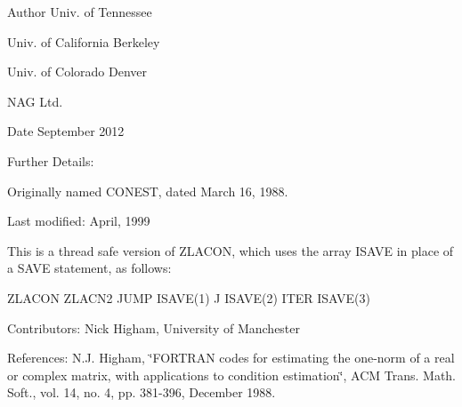 \begin{DoxyAuthor}{Author}
Univ. of Tennessee 

Univ. of California Berkeley 

Univ. of Colorado Denver 

N\+A\+G Ltd. 
\end{DoxyAuthor}
\begin{DoxyDate}{Date}
September 2012 
\end{DoxyDate}
\begin{DoxyParagraph}{Further Details\+: }
\begin{DoxyVerb}  Originally named CONEST, dated March 16, 1988.

  Last modified:  April, 1999

  This is a thread safe version of ZLACON, which uses the array ISAVE
  in place of a SAVE statement, as follows:

     ZLACON     ZLACN2
      JUMP     ISAVE(1)
      J        ISAVE(2)
      ITER     ISAVE(3)\end{DoxyVerb}
 
\end{DoxyParagraph}
\begin{DoxyParagraph}{Contributors\+: }
Nick Higham, University of Manchester 
\end{DoxyParagraph}
\begin{DoxyParagraph}{References\+: }
N.\+J. Higham, \char`\"{}\+F\+O\+R\+T\+R\+A\+N codes for estimating the one-\/norm of
  a real or complex matrix, with applications to condition estimation\char`\"{}, A\+C\+M Trans. Math. Soft., vol. 14, no. 4, pp. 381-\/396, December 1988. 
\end{DoxyParagraph}
